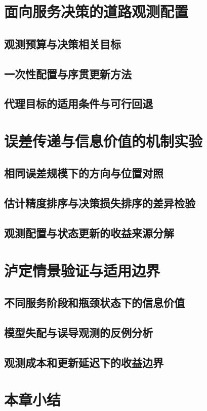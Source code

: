\ThesisBlank

\section{面向服务决策的道路观测配置}
\subsection{观测预算与决策相关目标}
\subsection{一次性配置与序贯更新方法}
\subsection{代理目标的适用条件与可行回退}

\ThesisBlank

\section{误差传递与信息价值的机制实验}
\subsection{相同误差规模下的方向与位置对照}
\subsection{估计精度排序与决策损失排序的差异检验}
\subsection{观测配置与状态更新的收益来源分解}

\ThesisBlank

\section{泸定情景验证与适用边界}
\subsection{不同服务阶段和瓶颈状态下的信息价值}
\subsection{模型失配与误导观测的反例分析}
\subsection{观测成本和更新延迟下的收益边界}

\ThesisBlank

\section{本章小结}
\ThesisBlank
